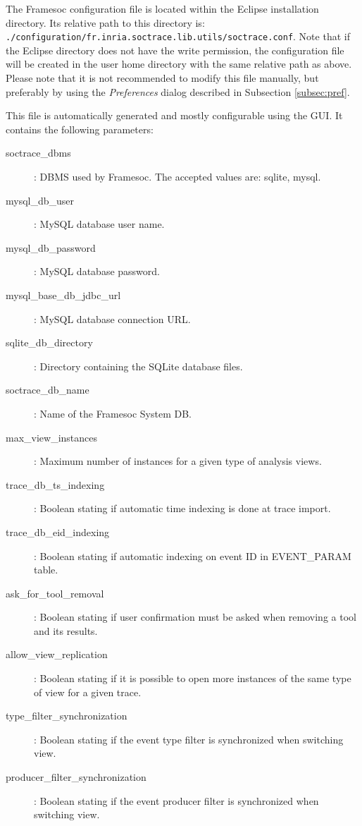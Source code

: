 \documentclass[twoside]{article}
\begin{document}
\begin{sloppypar}
The Framesoc configuration file is located within the Eclipse installation directory.
Its relative path to this directory is:  \texttt{./configuration/fr.inria.soctrace.lib.utils/soctrace.conf}. Note that if the Eclipse directory does not have the write permission, the configuration file will be created in the user home directory with the same relative path as above. Please note that it is not recommended to modify this file manually, but preferably by using the \textit{Preferences} dialog described in Subsection \ref{subsec:pref}. 

This file is automatically generated and mostly configurable using the GUI. 
It contains the following parameters:
\begin{description}
 \item[soctrace\_dbms]: DBMS used by Framesoc. The accepted values are: sqlite, mysql.
 \item[mysql\_db\_user]: MySQL database user name.
 \item[mysql\_db\_password]: MySQL database password.
 \item[mysql\_base\_db\_jdbc\_url]: MySQL database connection URL.
 \item[sqlite\_db\_directory]: Directory containing the SQLite database files.
 \item[soctrace\_db\_name]: Name of the Framesoc System DB.
 \item[max\_view\_instances]: Maximum number of instances for a given type of analysis views.
 \item[trace\_db\_ts\_indexing]: Boolean stating if automatic time indexing is done at trace import.
 \item[trace\_db\_eid\_indexing]: Boolean stating if automatic indexing on event ID in EVENT\_PARAM table.
 \item[ask\_for\_tool\_removal]: Boolean stating if user confirmation must be asked when removing a tool and its results.
 \item[allow\_view\_replication]: Boolean stating if it is possible to open more instances of the same type of view for a given trace.
 \item[type\_filter\_synchronization]: Boolean stating if the event type filter is synchronized when switching view.
 \item[producer\_filter\_synchronization]: Boolean stating if the event producer filter is synchronized when switching view.

\end{description}


\end{sloppypar}
\end{document}
